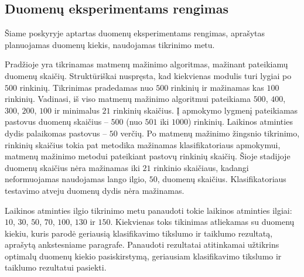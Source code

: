 \documentclass[]{vgtuef}
\begin{document}
\subsection{Duomenų eksperimentams rengimas}

Šiame poskyryje aptartas duomenų eksperimentams rengimas, aprašytas planuojamas duomenų kiekis, naudojamas tikrinimo metu.

Pradžioje yra tikrinamas matmenų mažinimo algoritmas, mažinant pateikiamų duomenų skaičių. Struktūriškai nuspręsta, kad kiekvienas modulis turi lygiai po $500$ rinkinių. Tikrinimas pradedamas nuo $500$ rinkinių ir mažinamas kas $100$ rinkinių. Vadinasi, iš viso matmenų mažinimo algoritmui pateikiama $500$, $400$, $300$, $200$, $100$ ir minimalus $21$ rinkinių skaičius. Į apmokymo lygmenį pateikiamas pastovus duomenų skaičius -- $500$ (nuo $501$ iki $1000$) rinkinių. Laikinos atminties dydis palaikomas pastovus -- $50$ verčių. Po matmenų mažinimo žingsnio tikrinimo, rinkinių skaičius tokia pat metodika mažinamas klasifikatoriaus apmokymui, matmenų mažinimo metodui pateikiant pastovų rinkinių skaičių. Šioje stadijoje duomenų skaičius nėra mažinamas iki $21$ rinkinio skaičiaus, kadangi neformuojamas naudojamas lango ilgio, $50$, duomenų skaičius. Klasifikatoriaus testavimo atveju duomenų dydis nėra mažinamas.

Laikinos atminties ilgio tikrinimo metu panaudoti tokie laikinos atminties ilgiai: $10$, $30$, $50$, $70$, $100$, $130$ ir $150$. Kiekvienas toks tikinimas atliekamas su duomenų kiekiu, kuris parodė geriausią klasifikavimo tikslumo ir taiklumo rezultatą, aprašytą ankstesniame paragrafe. Panaudoti rezultatai atitinkamai užtikrins optimalų duomenų kiekio pasiskirstymą, geriausiam klasifikavimo tikslumo ir taiklumo rezultatui pasiekti.

\end{document}
